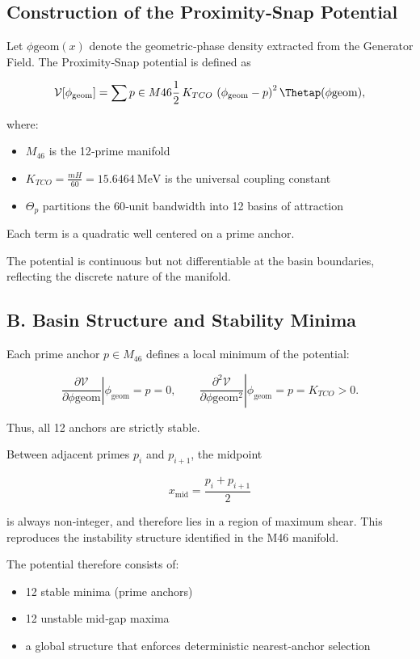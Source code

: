 \documentclass[reprint,amsmath,amssymb,aps,prl,floatfix]{revtex4-2}
\begin{document}
\subsection{Construction of the Proximity‑Snap Potential}

Let \(\phi{\mathrm{geom}}(x)\) denote the geometric‑phase density extracted from the Generator Field. The Proximity‑Snap potential is defined as

\[
\mathcal{V}[\phi_{\mathrm{geom}}]
=
\sum{p\in M{46}}
\frac{1}{2}\,K_{TCO}\,
\left(\phi_{\mathrm{geom}} - p\right)^2
\Thetap(\phi{\mathrm{geom}}),
\]

where:
\begin{itemize}
\item \(M_{46}\) is the 12‑prime manifold  
\item \(K_{TCO} = \frac{mH}{60} = 15.6464\ \mathrm{MeV}\) is the universal coupling constant  
\item \(\Theta_p\) partitions the 60‑unit bandwidth into 12 basins of attraction  
\end{itemize}

Each term is a quadratic well centered on a prime anchor.  
\medskip

The potential is continuous but not differentiable at the basin boundaries, reflecting the discrete nature of the manifold.

\subsection{B. Basin Structure and Stability Minima}

Each prime anchor \(p\in M_{46}\) defines a local minimum of the potential:

\[
\left.\frac{\partial \mathcal{V}}{\partial \phi{\mathrm{geom}}}\right|{\phi_{\mathrm{geom}} = p} = 0,
\qquad
\left.\frac{\partial^2 \mathcal{V}}{\partial \phi{\mathrm{geom}}^2}\right|{\phi_{\mathrm{geom}} = p}
= K_{TCO} > 0.
\]

Thus, all 12 anchors are strictly stable.
\medskip

Between adjacent primes \(p_i\) and \(p_{i+1}\), the midpoint

\[
x_{\mathrm{mid}} = \frac{p_i + p_{i+1}}{2}
\]
\medskip

is always non‑integer, and therefore lies in a region of maximum shear.  
This reproduces the instability structure identified in the M46 manifold.
\medskip

The potential therefore consists of:
\begin{itemize}
\item 12 stable minima (prime anchors)  
\item 12 unstable mid‑gap maxima  
\item a global structure that enforces deterministic nearest‑anchor selection  
\end{itemize}
\end{document}
